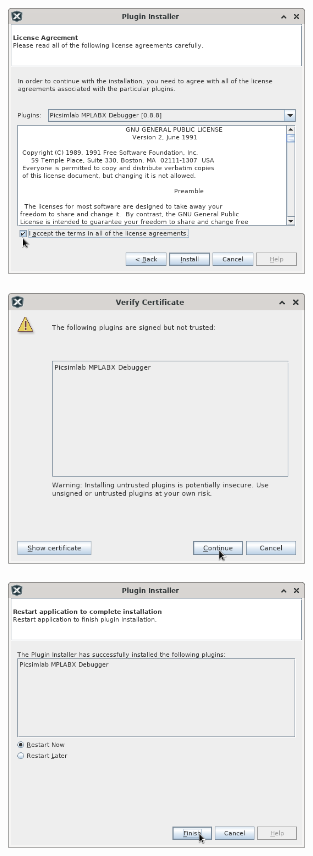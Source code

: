 \begin{figure}[H]
\center
\includegraphics[width=0.7\textwidth]{img/hmd/mplab07.png} 
\end{figure} 

\begin{figure}[H]
\center
\includegraphics[width=0.7\textwidth]{img/hmd/mplab08.png} 
\end{figure} 

\begin{figure}[H]
\center
\includegraphics[width=0.7\textwidth]{img/hmd/mplab09.png} 
\end{figure} 


